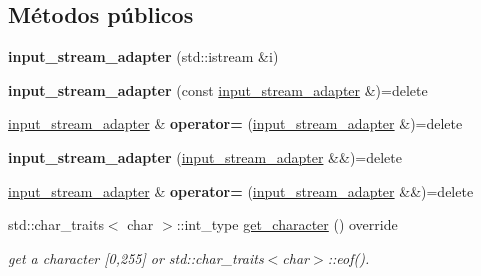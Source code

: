 \subsection*{Métodos públicos}
\begin{DoxyCompactItemize}
\item 
\mbox{\label{classnlohmann_1_1detail_1_1input__stream__adapter_af487152e4606d013eb4ec6a90eaf82ea}} 
{\bfseries input\+\_\+stream\+\_\+adapter} (std\+::istream \&i)
\item 
\mbox{\label{classnlohmann_1_1detail_1_1input__stream__adapter_a5190fe4d0c5ff2e3b348b28ee3bb2218}} 
{\bfseries input\+\_\+stream\+\_\+adapter} (const \mbox{\hyperlink{classnlohmann_1_1detail_1_1input__stream__adapter}{input\+\_\+stream\+\_\+adapter}} \&)=delete
\item 
\mbox{\label{classnlohmann_1_1detail_1_1input__stream__adapter_aeac5048221929b8f7558d1698dd0fb3a}} 
\mbox{\hyperlink{classnlohmann_1_1detail_1_1input__stream__adapter}{input\+\_\+stream\+\_\+adapter}} \& {\bfseries operator=} (\mbox{\hyperlink{classnlohmann_1_1detail_1_1input__stream__adapter}{input\+\_\+stream\+\_\+adapter}} \&)=delete
\item 
\mbox{\label{classnlohmann_1_1detail_1_1input__stream__adapter_a0ae74b874f7db43640905cb7f2442b1d}} 
{\bfseries input\+\_\+stream\+\_\+adapter} (\mbox{\hyperlink{classnlohmann_1_1detail_1_1input__stream__adapter}{input\+\_\+stream\+\_\+adapter}} \&\&)=delete
\item 
\mbox{\label{classnlohmann_1_1detail_1_1input__stream__adapter_a3577dff99cc91968557b52959b0363e4}} 
\mbox{\hyperlink{classnlohmann_1_1detail_1_1input__stream__adapter}{input\+\_\+stream\+\_\+adapter}} \& {\bfseries operator=} (\mbox{\hyperlink{classnlohmann_1_1detail_1_1input__stream__adapter}{input\+\_\+stream\+\_\+adapter}} \&\&)=delete
\item 
\mbox{\label{classnlohmann_1_1detail_1_1input__stream__adapter_ae0760af923583de6354725e901d1869d}} 
std\+::char\+\_\+traits$<$ char $>$\+::int\+\_\+type \mbox{\hyperlink{classnlohmann_1_1detail_1_1input__stream__adapter_ae0760af923583de6354725e901d1869d}{get\+\_\+character}} () override
\begin{DoxyCompactList}\small\item\em get a character \mbox{[}0,255\mbox{]} or std\+::char\+\_\+traits$<$char$>$\+::eof(). \end{DoxyCompactList}\end{DoxyCompactItemize}


